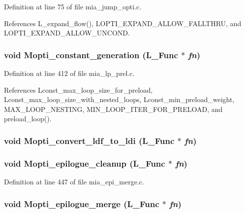 Definition at line 75 of file mia\_\-jump\_\-opti.c.

References L\_\-expand\_\-flow(), LOPTI\_\-EXPAND\_\-ALLOW\_\-FALLTHRU, and LOPTI\_\-EXPAND\_\-ALLOW\_\-UNCOND.
\subsubsection{\setlength{\rightskip}{0pt plus 5cm}void Mopti\_\-constant\_\-generation (L\_\-Func $\ast$ {\em fn})}\label{mia__opti_8h_ce49d15c4fd47f651213d2f0a5df9f71}




Definition at line 412 of file mia\_\-lp\_\-prel.c.

References Lconst\_\-max\_\-loop\_\-size\_\-for\_\-preload, Lconst\_\-max\_\-loop\_\-size\_\-with\_\-nested\_\-loops, Lconst\_\-min\_\-preload\_\-weight, MAX\_\-LOOP\_\-NESTING, MIN\_\-LOOP\_\-ITER\_\-FOR\_\-PRELOAD, and preload\_\-loop().
\subsubsection{\setlength{\rightskip}{0pt plus 5cm}void Mopti\_\-convert\_\-ldf\_\-to\_\-ldi (L\_\-Func $\ast$ {\em fn})}\label{mia__opti_8h_4afb2b153015f2c004a58a177fea24a4}


\subsubsection{\setlength{\rightskip}{0pt plus 5cm}void Mopti\_\-epilogue\_\-cleanup (L\_\-Func $\ast$ {\em fn})}\label{mia__opti_8h_b609816a640af52484e7da61b0140c69}




Definition at line 447 of file mia\_\-epi\_\-merge.c.
\subsubsection{\setlength{\rightskip}{0pt plus 5cm}void Mopti\_\-epilogue\_\-merge (L\_\-Func $\ast$ {\em fn})}\label{mia__opti_8h_9bd4d0715f1c8006f178d8d2e1664cbc}




